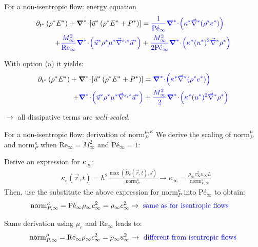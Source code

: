 \documentclass[xcolor=dvipsnames,10pt]{beamer}
\renewcommand{\Re}{\textrm{Re}}
\newcommand{\Pe}{\textrm{P\'e}}
\newcommand{\divv}[1]{\boldsymbol{\nabla}^{#1}\! \cdot \!}
\newcommand{\gradd}[1]{\vec{\nabla}^{#1}}
\newcommand{\norm}{\textrm{norm}}
\begin{document}
\begin{frame}{For a non-isentropic flow: energy equation}
\begin{align}
\partial_{t^*} \left( \rho^* E^* \right) 
+ \divv{*}  \left[ \vec{u}^* \left( \rho^* E^* + P^* \right) \right] 
&=
\textcolor{blue}{\frac{1}{\Pe_\infty} \divv{*}  \left( \kappa^*  \gradd{*} (\rho^* e^*) \right)} \nonumber  \\
+
\textcolor{blue}{\frac{M_\infty^2}{\Re_\infty} \divv{*}  \left( \vec{u}^* \rho^* \mu^* \gradd{s,*} \vec{u}^* \right)}
&+ 
\textcolor{blue}{\frac{M_\infty^2}{2 \Pe_\infty} \divv{*}  \left(\kappa^* (u^*)^2 \gradd{*} \rho^* \right)} \nonumber
\end{align}
\begin{block}{With option (a) it yields:}
\begin{align}
\partial_{t^*} \left( \rho^* E^* \right) 
+ \divv{*}  \left[ \vec{u}^* \left( \rho^* E^* + P^* \right) \right] 
&=
\textcolor{blue}{ \divv{*}  \left( \kappa^*  \gradd{*} (\rho^* e^*) \right)} \nonumber  \\
+
\textcolor{blue}{ \divv{*}  \left( \vec{u}^* \rho^* \mu^* \gradd{s,*} \vec{u}^* \right)}
&+ 
\textcolor{blue}{\frac{M_\infty^2}{2} \divv{*}  \left(\kappa^* (u^*)^2 \gradd{*} \rho^* \right)} \nonumber
\end{align}
\end{block}
$\to$ all dissipative terms are \emph{well-scaled}.
\end{frame}
\begin{frame}{For a non-isentropic flow: derivation of $\norm_P^{\mu, \kappa}$ }
We derive the scaling of $\norm_P^\mu$ and $\norm_P^\kappa$ when $\Re_\infty = M_\infty^2$ and $\Pe_\infty = 1$:
\begin{block}{}
Derive an expression for $\kappa_\infty$:
\begin{align}
&\kappa_e(\vec{r},t) = h^2 \frac{\max \left( \tilde{D}_e(\vec{r},t), J \right)}{\norm_P^\kappa} \longrightarrow \kappa_\infty = \frac{ \rho_\infty c_\infty^2 u_\infty L }{ \norm_{P,\infty}^\kappa } \nonumber 
\end{align}
Then, use the substitute the above expression for $\norm_P^\kappa$ into $\Pe_\infty$ to obtain:
\begin{align}
&\norm_{P,\infty}^{\kappa} = \Pe_\infty \rho_\infty c_\infty^2 = \rho_\infty c_\infty^2 \to \text{\color{blue}{ same as for isentropic flows}}\nonumber
\end{align}
\end{block}
\begin{block}{}
Same derivation using $\mu_e$ and $\Re_\infty$ leads to:
\begin{align}
\norm_{P,\infty}^{\mu} = \Re_\infty \rho_\infty c_\infty^2 = \rho_\infty u_\infty^2 \to \text{\color{blue}{ different from isentropic flows}}\nonumber
\end{align}
\end{block}
\end{frame}
\end{document}

